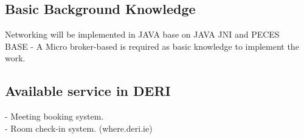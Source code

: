 \documentclass[a4paper]{llncs}
\newcommand{\head}[1]{\textnormal {\textbf{#1}}}
\begin{document}

\subsection{Basic Background Knowledge}
Networking will be implemented in JAVA base on JAVA JNI and PECES\\
BASE - A Micro broker-based is required as basic knowledge to implement the work.
\subsection{Available service in DERI}
- Meeting booking system.\\
- Room check-in system. (where.deri.ie)


\end{document}
